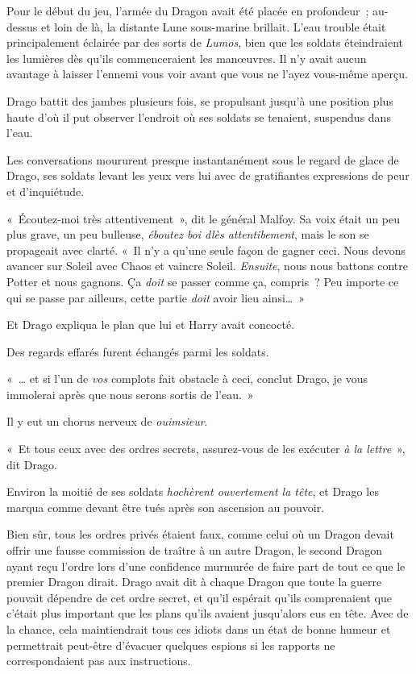 Pour le début du jeu, l'armée du Dragon avait été placée en profondeur~; au-dessus et loin de là, la distante Lune sous-marine brillait. L'eau trouble était principalement éclairée par des sorts de \emph{Lumos}, bien que les soldats éteindraient les lumières dès qu'ils commenceraient les manœuvres. Il n'y avait aucun avantage à laisser l'ennemi vous voir avant que vous ne l'ayez vous-même aperçu.

Drago battit des jambes plusieurs fois, se propulsant jusqu'à une position plus haute d'où il put observer l'endroit où ses soldats se tenaient, suspendus dans l'eau.

Les conversations moururent presque instantanément sous le regard de glace de Drago, ses soldats levant les yeux vers lui avec de gratifiantes expressions de peur et d'inquiétude.

«~Écoutez-moi très attentivement~», dit le général Malfoy. Sa voix était un peu plus grave, un peu bulleuse, \emph{éboutez boi dlès attentibement}, mais le son se propageait avec clarté. «~Il n'y a qu'une seule façon de gagner ceci. Nous devons avancer sur Soleil avec Chaos et vaincre Soleil. \emph{Ensuite}, nous nous battons contre Potter et nous gagnons. Ça \emph{doit} se passer comme ça, compris~? Peu importe ce qui se passe par ailleurs, cette partie \emph{doit} avoir lieu ainsi…~»

Et Drago expliqua le plan que lui et Harry avait concocté.

Des regards effarés furent échangés parmi les soldats.

«~… et si l'un de \emph{vos} complots fait obstacle à ceci, conclut Drago, je vous immolerai après que nous serons sortis de l'eau.~»

Il y eut un chorus nerveux de \emph{ouimsieur}.

«~Et tous ceux avec des ordres secrets, assurez-vous de les exécuter \emph{à la lettre}~», dit Drago.

Environ la moitié de ses soldats \emph{hochèrent ouvertement la tête}, et Drago les marqua comme devant être tués après son ascension au pouvoir.

Bien sûr, tous les ordres privés étaient faux, comme celui où un Dragon devait offrir une fausse commission de traître à un autre Dragon, le second Dragon ayant reçu l'ordre lors d'une confidence murmurée de faire part de tout ce que le premier Dragon dirait. Drago avait dit à chaque Dragon que toute la guerre pouvait dépendre de cet ordre secret, et qu'il espérait qu'ils comprenaient que c'était plus important que les plans qu'ils avaient jusqu'alors eus en tête. Avec de la chance, cela maintiendrait tous ces idiots dans un état de bonne humeur et permettrait peut-être d'évacuer quelques espions si les rapports ne correspondaient pas aux instructions.

